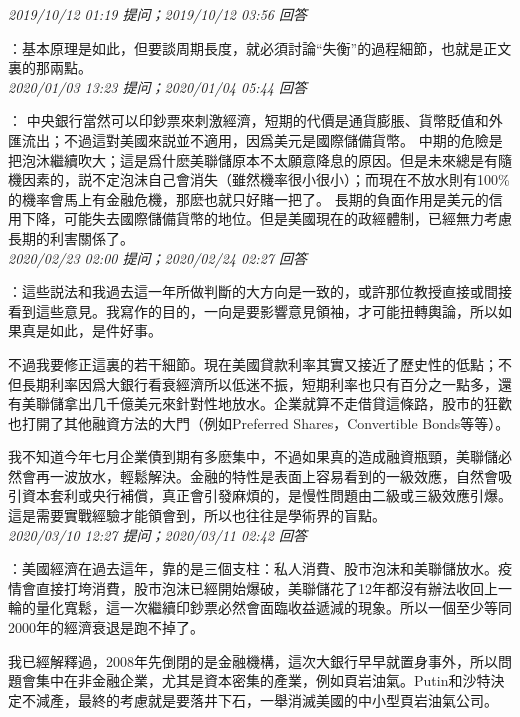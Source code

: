 \documentclass[twocolumn]{ctexart}
\begin{document}
\textit{\hfill\noindent\small 2019/10/12 01:19 提问；2019/10/12 03:56 回答}

：基本原理是如此，但要談周期長度，就必須討論“失衡”的過程細節，也就是正文裏的那兩點。
\\

\textit{\hfill\noindent\small 2020/01/03 13:23 提问；2020/01/04 05:44 回答}

：
中央銀行當然可以印鈔票來刺激經濟，短期的代價是通貨膨脹、貨幣貶值和外匯流出；不過這對美國來説並不適用，因爲美元是國際儲備貨幣。 
中期的危險是把泡沐繼續吹大；這是爲什麽美聯儲原本不太願意降息的原因。但是未來總是有隨機因素的，説不定泡沫自己會消失（雖然機率很小很小）；而現在不放水則有100\%的機率會馬上有金融危機，那麽也就只好賭一把了。 
長期的負面作用是美元的信用下降，可能失去國際儲備貨幣的地位。但是美國現在的政經體制，已經無力考慮長期的利害關係了。
\\

\textit{\hfill\noindent\small 2020/02/23 02:00 提问；2020/02/24 02:27 回答}

：這些説法和我過去這一年所做判斷的大方向是一致的，或許那位教授直接或間接看到這些意見。我寫作的目的，一向是要影響意見領袖，才可能扭轉輿論，所以如果真是如此，是件好事。

不過我要修正這裏的若干細節。現在美國貸款利率其實又接近了歷史性的低點；不但長期利率因爲大銀行看衰經濟所以低迷不振，短期利率也只有百分之一點多，還有美聯儲拿出几千億美元來針對性地放水。企業就算不走借貸這條路，股市的狂歡也打開了其他融資方法的大門（例如Preferred Shares，Convertible Bonds等等）。

我不知道今年七月企業債到期有多麽集中，不過如果真的造成融資瓶頸，美聯儲必然會再一波放水，輕鬆解決。金融的特性是表面上容易看到的一級效應，自然會吸引資本套利或央行補償，真正會引發麻煩的，是慢性問題由二級或三級效應引爆。這是需要實戰經驗才能領會到，所以也往往是學術界的盲點。
\\

\textit{\hfill\noindent\small 2020/03/10 12:27 提问；2020/03/11 02:42 回答}

：美國經濟在過去這年，靠的是三個支柱：私人消費、股市泡沫和美聯儲放水。疫情會直接打垮消費，股市泡沫已經開始爆破，美聯儲花了12年都沒有辦法收回上一輪的量化寬鬆，這一次繼續印鈔票必然會面臨收益遞減的現象。所以一個至少等同2000年的經濟衰退是跑不掉了。

我已經解釋過，2008年先倒閉的是金融機構，這次大銀行早早就置身事外，所以問題會集中在非金融企業，尤其是資本密集的產業，例如頁岩油氣。Putin和沙特決定不減產，最終的考慮就是要落井下石，一舉消滅美國的中小型頁岩油氣公司。
\end{document}
